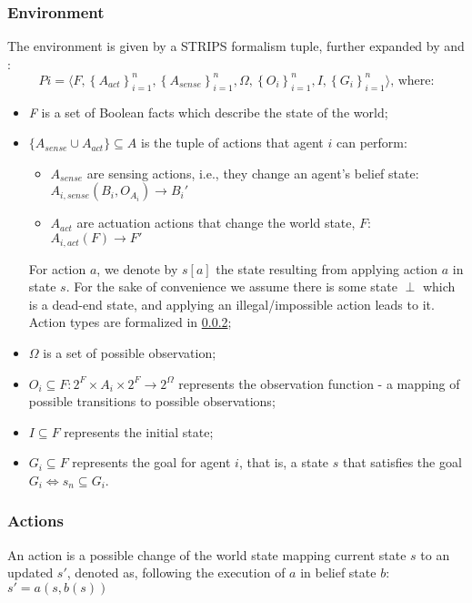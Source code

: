 \documentclass[fleqn,10pt]{olplainarticle}
\begin{document}
\subsubsection{Environment}
The environment is given by a STRIPS formalism \cite{fikes_strips_1971} tuple, further expanded by \cite{maliah_partially_2014}  and \cite{karpas_automated_2017}:
\begin{equation}
Pi = \langle F, \left\{ A_{act} \right\}_{i=1}^n, \left\{ A_{sense} \right\}_{i=1}^n, \Omega, \left\{ O_i \right\}_{i=1}^n, I, \left\{ G_i \right\}_{i=1}^n \rangle \text{, where:} 
\end{equation}
\begin{itemize}
    \item \textit{F} is a set of Boolean facts which describe the state of the world;
    \item $\{A_{sense} \cup A_{act}\} \subseteq A$ is the tuple of actions that agent $i$ can perform:
    \begin{itemize}
        \item $A_{sense}$ are sensing actions, i.e., they change an agent's belief state: $A_{i, sense}(B_i, O_{A_i}) \rightarrow B_i'$
        \item $A_{act}$ are actuation actions that change the world state, $F$: $A_{i, act}(F) \rightarrow F'$
    \end{itemize}
For action $a$, we denote by $s[a]$ the state resulting from applying action $a$ in state $s$. For the sake of convenience we assume there is some state $\perp$ which is a dead-end state, and applying an illegal/impossible action leads to it. Action types are formalized in \ref{actions};
\item $\Omega$ is a set of possible observation;
    \item     $O_i \subseteq F: 2^F \times A_i \times 2^F \rightarrow 2^\Omega$ represents the observation function - a mapping of possible transitions to possible observations; 
    \item     $I \subseteq F$ represents the initial state;
    \item $G_i \subseteq F$ represents the goal for agent $i$, that is, a state $s$ that satisfies the goal $G_i \iff s_n \subseteq G_i$. \label{goal}
\end{itemize}
\subsubsection{Actions} \label{actions}
An action is a possible change of the world state mapping current state $s$ to an updated $s'$, denoted as, following the execution of $a$ in belief state $b$: $s'=a(s,b(s))$
\end{document}
